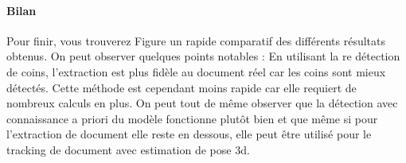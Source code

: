 \paragraph{Bilan}
Pour finir, vous trouverez Figure %
un rapide comparatif des différents résultats obtenus. On peut observer quelques points notables : En utilisant la re détection de coins, l'extraction est plus fidèle au document réel car les coins sont mieux détectés. Cette méthode est cependant moins rapide car elle requiert de nombreux calculs en plus. On peut tout de même observer que la détection avec connaissance a priori du modèle fonctionne plutôt bien et que même si pour l'extraction de document elle reste en dessous, elle peut être utilisé pour le tracking de document avec estimation de pose 3d.

